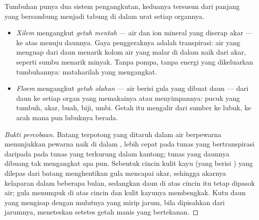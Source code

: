 \begin{proposition}\label{prop:g12:plant-rooted-life:saps}
Tumbuhan punya dua sistem pengangkutan, keduanya tersusun dari 
panjang yang bersambung menjadi tabung di dalam urat setiap organnya.
\begin{itemize}
  \item \emph{Xilem} mengangkut \emph{getah mentah} ---
        air dan ion mineral yang diserap akar --- ke atas menuju
        daunnya. Gaya penggeraknya adalah transpirasi: air yang
        menguap dari  daun menarik kolom air yang malar di dalam
         naik dari akar, seperti sumbu menarik minyak. Tanpa
        pompa, tanpa energi yang dikeluarkan tumbuhannya: mataharilah
        yang mengangkat.
  \item \emph{Floem} mengangkut \emph{getah olahan} ---
        air berisi gula yang dibuat daun --- dari daun ke setiap organ
        yang memakainya atau menyimpannya: pucuk yang tumbuh, akar,
        buah, biji, umbi. Getah itu mengalir dari sumber ke lubuk, ke
        arah mana pun lubuknya berada.
\end{itemize}
\end{proposition}
\begin{proof}[Bukti percobaan]
Batang terpotong yang ditaruh dalam air berpewarna menunjukkan pewarna
naik di dalam , lebih cepat pada tunas yang bertranspirasi
daripada pada tunas yang terkurung dalam kantong; tunas yang daunnya
dibuang tak mengangkat apa pun. Sebentuk cincin kulit kayu (yang berisi
) yang dilepas dari batang menghentikan gula mencapai akar,
sehingga akarnya kelaparan dalam beberapa bulan, sedangkan daun di atas
cincin itu tetap dipasok air; gula menumpuk di atas cincin dan kulit
kayunya membengkak. Kutu daun yang mengisap  dengan mulutnya yang
mirip jarum, bila dipisahkan dari jarumnya, meneteskan setetes getah
manis yang bertekanan.
\end{proof}

